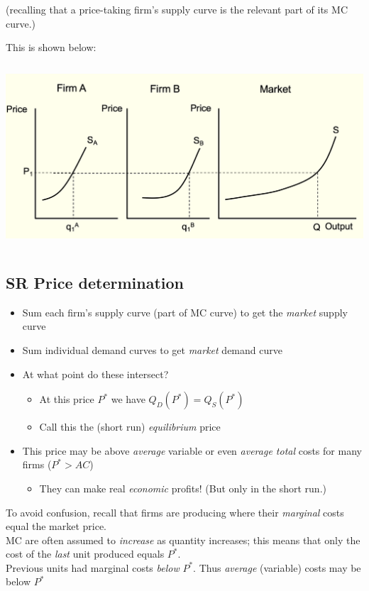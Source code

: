 \documentclass[]{article}
\providecommand{\tightlist}{%
  \setlength{\itemsep}{0pt}\setlength{\parskip}{0pt}}
\begin{document}
(recalling that a price-taking firm's supply curve is the relevant part
of its MC curve.)

This is shown below:

\includegraphics[height=2.7in]{picsfigs/srsupply.png}

\hypertarget{sr-price-determination}{%
\subsection{SR Price determination}\label{sr-price-determination}}

\begin{itemize}
\item
  Sum each firm's supply curve (part of MC curve) to get the
  \emph{market} supply curve
\item
  Sum individual demand curves to get \emph{market} demand curve
\item
  At what point do these intersect?

  \begin{itemize}
  \tightlist
  \item
    At this price \(P^*\) we have \(Q_D(P^*)=Q_S(P^*)\)
  \item
    Call this the (short run) \emph{equilibrium} price
  \end{itemize}
\item
  This price may be above \emph{average} variable or even \emph{average
  total} costs for many firms (\(P^*>AC\))

  \begin{itemize}
  \tightlist
  \item
    They can make real \emph{economic} profits! (But only in the short
    run.)
  \end{itemize}
\end{itemize}

To avoid confusion, recall that firms are producing where their
\emph{marginal} costs equal the market price.\\
MC are often assumed to \emph{increase} as quantity increases; this
means that only the cost of the \emph{last} unit produced equals
\(P^*\).\\
Previous units had marginal costs \emph{below} \(P^*\). Thus
\emph{average} (variable) costs may be below \(P^*\)
\end{document}
